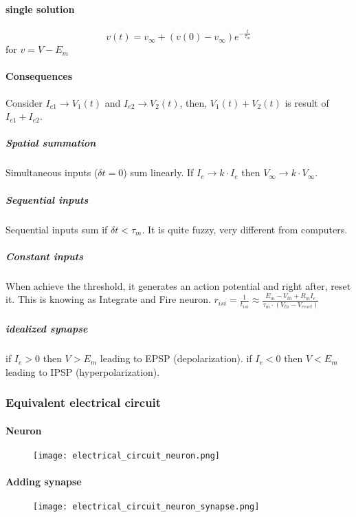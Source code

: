 \documentclass[main]{subfiles}
\begin{document}
\paragraph{single solution}
\[v(t) = v_\infty+(v(0)-v_\infty)e^{-\frac{t}{\tau_m}}\]
for $v = V - E_m$

\paragraph{Consequences}
Consider $I_{e1} \rightarrow V_1(t)$ and $I_{e2} \rightarrow V_2(t)$, then, $V_1(t) + V_2(t)$ is result of $I_{e1} + I_{e2}$.

\subparagraph{Spatial summation} 
Simultaneous inputs ($\delta t = 0$) sum linearly.
If $I_e \rightarrow k \cdot I_e$ then $V_\infty \rightarrow k \cdot V_\infty$.

\subparagraph{Sequential inputs}
Sequential inputs sum if $\delta t < \tau_m$.
It is quite fuzzy, very different from computers.

\subparagraph{Constant inputs}
When achieve the threshold, it generates an action potential and right after, reset it. This is knowing as Integrate and Fire neuron.
$r_{isi} = \frac{1}{t_{isi}} \approx \frac{E_m - V_{th} + R_m I_e}{\tau_m \cdot (V_{th} - V_{reset})}$

\subparagraph{idealized synapse}
if $I_e > 0$ then $V > E_m$ leading to EPSP (depolarization). 
if $I_e < 0$ then $V < E_m$ leading to IPSP (hyperpolarization).

\subsubsection{Equivalent electrical circuit}

\paragraph{Neuron}
\begin{figure}[H]
	\centering
	\texttt{[image: electrical\_circuit\_neuron.png]}
\end{figure}

\paragraph{Adding synapse}

\begin{figure}[H]
	\centering
	\texttt{[image: electrical\_circuit\_neuron\_synapse.png]}
\end{figure}
\end{document}
